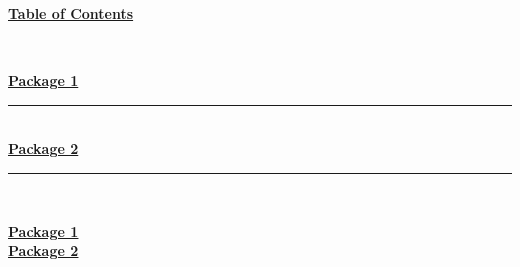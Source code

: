 \documentclass[12pt]{article}
\begin{document}
\begin{center}
	\hypertarget{toc}{\LARGE \underline{\textbf{Table of Contents}}}\\
\end{center}

\hyperlink{1}{\textbf{Package 1}}
\vspace{1mm}
\hrule
~\\

\hyperlink{2}{\textbf{Package 2}}
\vspace{1mm}
\hrule
~\\

\newpage

\hyperlink{toc}{\hypertarget{1}{\LARGE \underline{\textbf{Package 1}}}}\\
\newpage
\hyperlink{toc}{\hypertarget{2}{\LARGE \underline{\textbf{Package 2}}}}\\
\newpage
\end{document}
